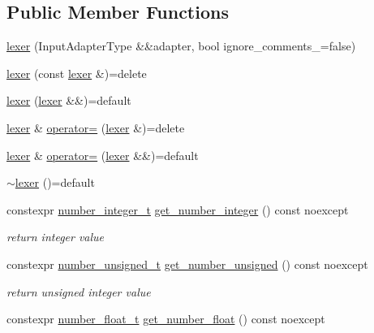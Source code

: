 \subsection*{Public Member Functions}
\begin{DoxyCompactItemize}
\item 
\hyperlink{classnlohmann_1_1detail_1_1lexer_a5498021440ac08dc6079a3597ae1e459}{lexer} (Input\+Adapter\+Type \&\&adapter, bool ignore\+\_\+comments\+\_\+=false)
\item 
\hyperlink{classnlohmann_1_1detail_1_1lexer_ab75d61c4de687717648c7698850ddb9b}{lexer} (const \hyperlink{classnlohmann_1_1detail_1_1lexer}{lexer} \&)=delete
\item 
\hyperlink{classnlohmann_1_1detail_1_1lexer_ae95416c7ae8b36f0dd0ab349eaa754a2}{lexer} (\hyperlink{classnlohmann_1_1detail_1_1lexer}{lexer} \&\&)=default
\item 
\hyperlink{classnlohmann_1_1detail_1_1lexer}{lexer} \& \hyperlink{classnlohmann_1_1detail_1_1lexer_af7e7002d4bb66e9104d752791b8070f8}{operator=} (\hyperlink{classnlohmann_1_1detail_1_1lexer}{lexer} \&)=delete
\item 
\hyperlink{classnlohmann_1_1detail_1_1lexer}{lexer} \& \hyperlink{classnlohmann_1_1detail_1_1lexer_a1383bb59c5efd4f9370ca3ee4ad1a4ba}{operator=} (\hyperlink{classnlohmann_1_1detail_1_1lexer}{lexer} \&\&)=default
\item 
\hyperlink{classnlohmann_1_1detail_1_1lexer_ac0557f111d82f7729a93ee9b40b31402}{$\sim$lexer} ()=default
\item 
constexpr \hyperlink{classnlohmann_1_1detail_1_1lexer_a594e61f96c87b4464beeab681111ac0c}{number\+\_\+integer\+\_\+t} \hyperlink{classnlohmann_1_1detail_1_1lexer_a9535d0c72adbe9fe149853ebad5faee8}{get\+\_\+number\+\_\+integer} () const noexcept
\begin{DoxyCompactList}\small\item\em return integer value \end{DoxyCompactList}\item 
constexpr \hyperlink{classnlohmann_1_1detail_1_1lexer_af6b19ef34b2e9ee2321cfaf62ee066cb}{number\+\_\+unsigned\+\_\+t} \hyperlink{classnlohmann_1_1detail_1_1lexer_abfc85ff04fcb1a5a8d8ea299a4c479e5}{get\+\_\+number\+\_\+unsigned} () const noexcept
\begin{DoxyCompactList}\small\item\em return unsigned integer value \end{DoxyCompactList}\item 
constexpr \hyperlink{classnlohmann_1_1detail_1_1lexer_a438a78e53120fd2c3ea049161d4798cb}{number\+\_\+float\+\_\+t} \hyperlink{classnlohmann_1_1detail_1_1lexer_adb1a71f6a3e65ed32c452a318967b61e}{get\+\_\+number\+\_\+float} () const noexcept

\end{DoxyCompactItemize}
